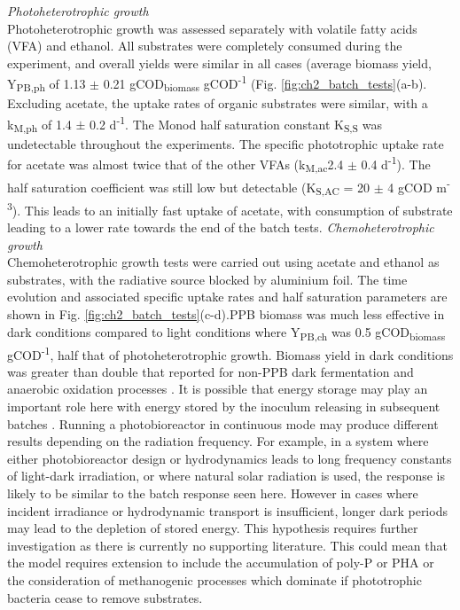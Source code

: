 \textit{Photoheterotrophic growth}\\
Photoheterotrophic growth was assessed separately with volatile fatty acids (VFA) and ethanol. All substrates were completely consumed during the experiment, and overall yields were similar in all cases (average biomass yield, Y\textsubscript{PB,ph} of 1.13 $\pm$ 0.21 gCOD\textsubscript{biomass} gCOD\textsuperscript{-1} (Fig. \ref{fig:ch2_batch_tests}(a-b). Excluding acetate, the uptake rates of organic substrates were similar, with a k\textsubscript{M,ph} of 1.4 $\pm$ 0.2 d\textsuperscript{-1}. The Monod half saturation constant K\textsubscript{S,S} was undetectable throughout the experiments. The specific phototrophic uptake rate for acetate was almost twice that of the other VFAs (k\textsubscript{M,ac}2.4 $\pm$ 0.4 d\textsuperscript{-1}). The half saturation coefficient was still low but detectable (K\textsubscript{S,AC} = 20 $\pm$ 4 gCOD m\textsuperscript{-3}). This leads to an initially fast uptake of acetate, with consumption of substrate leading to a lower rate towards the end of the batch tests. 
\skippingparagraph
\textit{Chemoheterotrophic growth}\\
Chemoheterotrophic growth tests were carried out using acetate and ethanol as substrates, with the radiative source blocked by aluminium foil. The time evolution and associated specific uptake rates and half saturation parameters are shown in Fig. \ref{fig:ch2_batch_tests}(c-d).PPB biomass was much less effective in dark conditions compared to light conditions where Y\textsubscript{PB,ch} was 0.5 gCOD\textsubscript{biomass} gCOD\textsuperscript{-1}, half that of photoheterotrophic growth. Biomass yield in dark conditions was greater than double that reported for non-PPB dark fermentation and anaerobic oxidation processes \cite{batstone2002}. It is possible that energy storage may play an important role here with energy stored by the inoculum releasing in subsequent batches \cite{liang2010}. Running a photobioreactor in continuous mode may produce different results depending on the radiation frequency. For example, in a system where either photobioreactor design or hydrodynamics leads to long frequency constants of light-dark irradiation, or where natural solar radiation is used, the response is likely to be similar to the batch response seen here. However in cases where incident irradiance or hydrodynamic transport is insufficient, longer dark periods may lead to the depletion of stored energy. This hypothesis requires further investigation as there is currently no supporting literature. This could mean that the model requires extension to include the accumulation of poly-P or PHA or the consideration of methanogenic processes which dominate if phototrophic bacteria cease to remove substrates.
